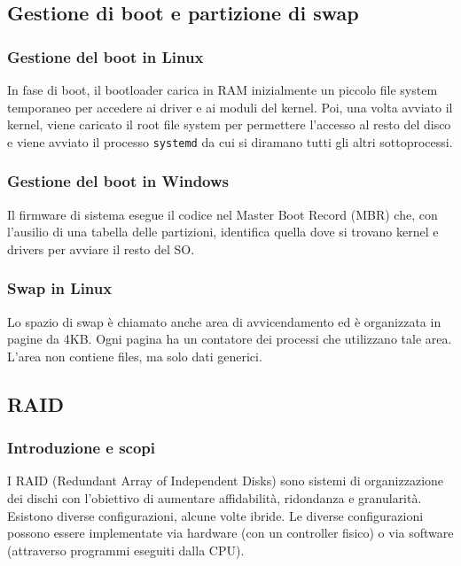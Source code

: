 \documentclass[a4paper]{article}
\begin{document}
\subsection{Gestione di boot e partizione di swap}
\subsubsection*{Gestione del boot in Linux}
In fase di boot, il bootloader carica in RAM inizialmente un piccolo file system temporaneo per accedere ai driver e ai moduli
del kernel. Poi, una volta avviato il kernel, viene caricato il root file system per permettere l'accesso al resto del disco e
viene avviato il processo \verb|systemd| da cui si diramano tutti gli altri sottoprocessi.

\subsubsection*{Gestione del boot in Windows}
Il firmware di sistema esegue il codice nel Master Boot Record (MBR) che, con l’ausilio di una tabella delle partizioni,
identifica quella dove si trovano kernel e drivers per avviare il resto del SO.

\subsubsection*{Swap in Linux}
Lo spazio di swap è chiamato anche area di avvicendamento ed è organizzata in pagine da 4KB. Ogni pagina ha un contatore dei
processi che utilizzano tale area. L'area non contiene files, ma solo dati generici.


\subsection{RAID}
\subsubsection*{Introduzione e scopi}
I RAID (Redundant Array of Independent Disks) sono sistemi di organizzazione dei dischi con l'obiettivo di aumentare affidabilità,
ridondanza e granularità. Esistono diverse configurazioni, alcune volte ibride. Le diverse configurazioni possono essere
implementate via hardware (con un controller fisico) o via software (attraverso programmi eseguiti dalla CPU).
\end{document}
